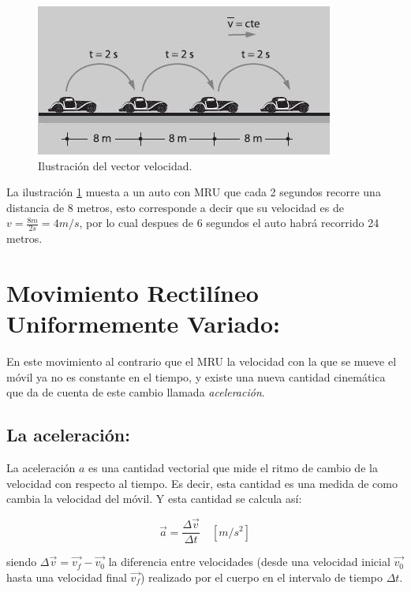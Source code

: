 \documentclass[a5paper,pagesize,10pt,bibtotoc,pointlessnumbers,
normalheadings,DIV=9,fleqn,x11names,table,twoside=false]{scrbook}
\begin{document}
\begin{figure}[ht]
 \centering
 \includegraphics[scale=0.8]{images/Movimiento_rectilineo_uniforme.jpg}
 \caption{Ilustración del vector velocidad.}\label{mru}
\end{figure} 
 
La ilustración \ref{mru} muesta a un auto con MRU que cada 2 segundos recorre una distancia de 8 metros, esto  corresponde a 
decir que su velocidad es de $v = \frac{8m}{2s} = 4 m/s$, por lo cual despues de 6 segundos el auto habrá recorrido 24 metros.

\section{Movimiento Rectilíneo Uniformemente Variado:}
 
En este movimiento al contrario que el MRU la velocidad con la que se mueve el móvil ya no es constante en el tiempo, y existe 
una nueva cantidad cinemática que da de cuenta de este cambio llamada \textit{aceleración}. 

\subsection{La aceleración:}

La aceleración $a$ es una cantidad vectorial que mide el ritmo de cambio de la velocidad con respecto al tiempo. Es decir, esta 
cantidad es una medida de como cambia la velocidad del móvil. Y esta cantidad se calcula así:

\begin{equation}
 \vec{a}=\frac{\Delta \vec{v}}{\Delta t}\quad [m/s^2] 
 \end{equation}
 
siendo $\Delta \vec{v}=\vec{v_f}-\vec{v_0}$ la diferencia entre velocidades (desde una velocidad inicial $\vec{v_0}$ hasta una 
velocidad final $\vec{v_f}$) realizado por el cuerpo en el intervalo de tiempo $\Delta t$.\\
\end{document}
